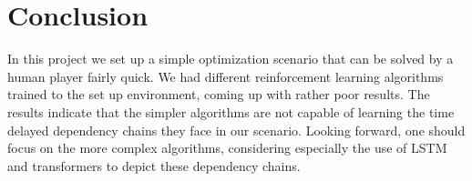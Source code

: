 \documentclass[12pt,a4paper]{article}
\begin{document}
\section{Conclusion}
In this project we set up a simple optimization scenario that can be solved by a human player fairly quick. We had different reinforcement learning algorithms trained to the set up environment, coming up with rather poor results. The results indicate that the simpler algorithms are not capable of learning the time delayed dependency chains they face in our scenario. Looking forward, one should focus on the more complex algorithms, considering especially the use of LSTM and transformers to depict these dependency chains.
\begin{appendix}
    \listoffigures
    \listoftables
    
\end{appendix}


\end{document}
